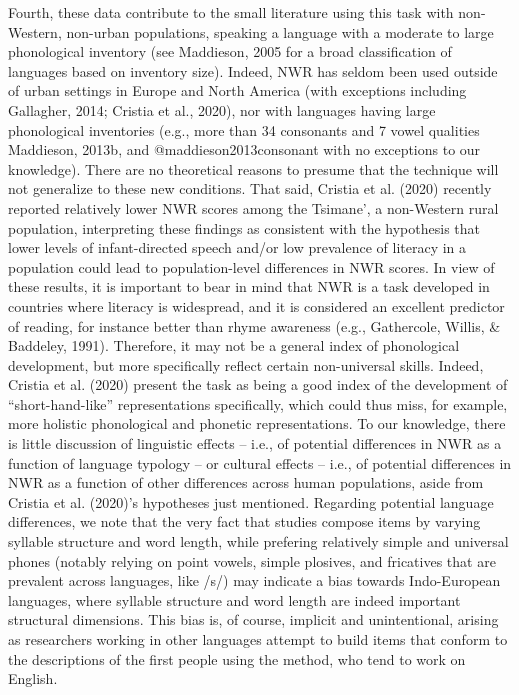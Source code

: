 \documentclass[english,,man,floatsintext]{apa6}
\begin{document}
Fourth, these data contribute to the small literature using this task with non-Western, non-urban populations, speaking a language with a moderate to large phonological inventory (see Maddieson, 2005 for a broad classification of languages based on inventory size). Indeed, NWR has seldom been used outside of urban settings in Europe and North America (with exceptions including Gallagher, 2014; Cristia et al., 2020), nor with languages having large phonological inventories (e.g., more than 34 consonants and 7 vowel qualities Maddieson, 2013b, and @maddieson2013consonant with no exceptions to our knowledge). There are no theoretical reasons to presume that the technique will not generalize to these new conditions. That said, Cristia et al. (2020) recently reported relatively lower NWR scores among the Tsimane', a non-Western rural population, interpreting these findings as consistent with the hypothesis that lower levels of infant-directed speech and/or low prevalence of literacy in a population could lead to population-level differences in NWR scores. In view of these results, it is important to bear in mind that NWR is a task developed in countries where literacy is widespread, and it is considered an excellent predictor of reading, for instance better than rhyme awareness (e.g., Gathercole, Willis, \& Baddeley, 1991). Therefore, it may not be a general index of phonological development, but more specifically reflect certain non-universal skills. Indeed, Cristia et al. (2020) present the task as being a good index of the development of \enquote{short-hand-like} representations specifically, which could thus miss, for example, more holistic phonological and phonetic representations. To our knowledge, there is little discussion of linguistic effects -- i.e., of potential differences in NWR as a function of language typology -- or cultural effects -- i.e., of potential differences in NWR as a function of other differences across human populations, aside from Cristia et al. (2020)'s hypotheses just mentioned. Regarding potential language differences, we note that the very fact that studies compose items by varying syllable structure and word length, while prefering relatively simple and universal phones (notably relying on point vowels, simple plosives, and fricatives that are prevalent across languages, like /s/) may indicate a bias towards Indo-European languages, where syllable structure and word length are indeed important structural dimensions. This bias is, of course, implicit and unintentional, arising as researchers working in other languages attempt to build items that conform to the descriptions of the first people using the method, who tend to work on English.
\end{document}
